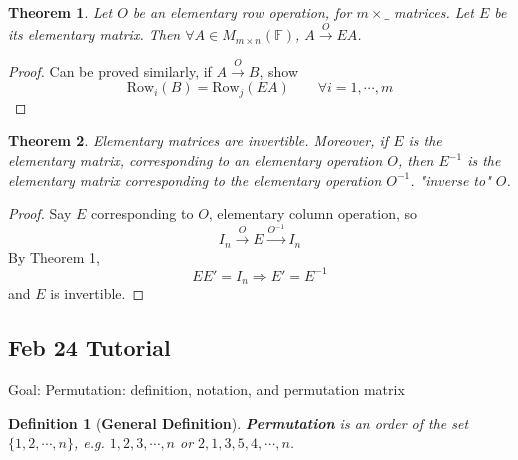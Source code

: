 \documentclass[12pt]{article}
\newtheorem{theorem}{Theorem}[subsection]
\newtheorem{definition}{Definition}[subsection]
\newcommand{\Row}{\mathrm{Row}}
\newcommand{\mF}{{\mathbb{F}}}
\begin{document}
	\begin{theorem}
		Let $O$ be an elementary row operation, for $m \times \_$ matrices.
		Let $E$ be its elementary matrix. Then
		$\forall A \in M_{m \times n}(\mF)$, $A \overset{O}{\longrightarrow}EA$. 
	\end{theorem}
	\begin{proof}
		Can be proved similarly, if $A \overset{O}{\longrightarrow }B$, 
		show
		\[
			\Row _i(B) = \Row_j(EA) \qquad \forall i = 1, \cdots, m
		\]
	\end{proof}

	\begin{theorem}
		Elementary matrices are invertible. Moreover, if $E$ is the elementary
		matrix, corresponding to an elementary operation $O$, then $E^{-1}$ is 
		the elementary matrix corresponding to the elementary operation $O^{-1}$.
		"inverse to" $O$. 
	\end{theorem}
	\begin{proof}
		Say $E$ corresponding to $O$, elementary column operation, so 
		\[
			I_n \overset{O}{\longrightarrow} E 
			\overset{O^{-1}}{\longrightarrow}I_n  
		\]
		By Theorem 1, 
		\[
			E E' = I_n \Rightarrow E' = E^{-1} 
		\]
		and $E$ is invertible. 
	\end{proof}





\newpage
\subsection{Feb 24 Tutorial}

Goal: Permutation: definition, notation, and permutation matrix

\begin{definition}[\textbf{General Definition}]
	\textbf{Permutation} is an order of the set $\{1, 2, \cdots, n\}$,
		e.g. $1, 2, 3, \cdots, n$ or $2, 1, 3, 5, 4, \cdots, n$. 
\end{definition}
\end{document}
